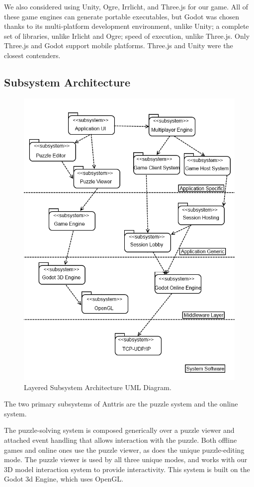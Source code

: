 \documentclass[12pt]{article}
\begin{document}
We also considered using Unity, Ogre, Irrlicht, and Three.js for our
game. All of these game engines can generate portable executables, but Godot
was chosen thanks to its multi-platform development environment, unlike Unity;
a complete set of libraries, unlike Irlicht and Ogre; speed of execution,
unlike Three.js. Only Three.js and Godot support mobile platforms.
Three.js and Unity were the closest contenders.



\subsection{Subsystem Architecture}
\begin{figure}[H]
    \centering
    \includegraphics[width=0.8\linewidth]{subsys_arch.png}
    \caption{Layered Subsystem Architecture UML Diagram.}
\end{figure}
The two primary subsystems of Anttris are the puzzle system and the online system.

The puzzle-solving system is composed generically over a puzzle viewer and attached event
handling that allows interaction with the puzzle. Both offline games and online ones use
the puzzle viewer, as does the unique puzzle-editing mode. The puzzle viewer is used by
all three unique modes, and works with our 3D model interaction system to provide
interactivity. This system is built on the Godot 3d Engine, which uses OpenGL.
\end{document}

